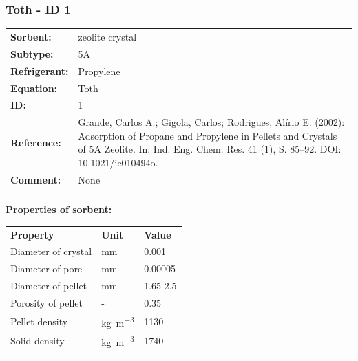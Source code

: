 \subsubsection{Toth - ID 1}
%
\begin{tabular}[l]{|lp{11.5cm}|}
\hline
\addlinespace

\textbf{Sorbent:} & zeolite crystal \\
\textbf{Subtype:} & 5A \\
\textbf{Refrigerant:} & Propylene \\
\textbf{Equation:} & Toth \\
\textbf{ID:} & 1 \\
\textbf{Reference:} & Grande, Carlos A.; Gigola, Carlos; Rodrigues, Alírio E. (2002): Adsorption of Propane and Propylene in Pellets and Crystals of 5A Zeolite. In: Ind. Eng. Chem. Res. 41 (1), S. 85–92. DOI: 10.1021/ie010494o. \\
\textbf{Comment:} & None \\

\addlinespace
\hline
\end{tabular}
\newline

\textbf{Properties of sorbent:}
\newline
%
\begin{longtable}[l]{lll}
\toprule
\addlinespace
\textbf{Property} & \textbf{Unit} & \textbf{Value} \\
\addlinespace
\midrule
\endhead
\bottomrule
\endfoot
\bottomrule
\endlastfoot
\addlinespace

Diameter of crystal & \si{\milli\meter} & 0.001\\
Diameter of pore & \si{\milli\meter} & 0.00005\\
Diameter of pellet & \si{\milli\meter} & 1.65-2.5\\
Porosity of pellet & - & 0.35\\
Pellet density & \si{\kilogram\per\cubic\meter} & 1130\\
Solid density & \si{\kilogram\per\cubic\meter} & 1740\\

\addlinespace\end{longtable}

